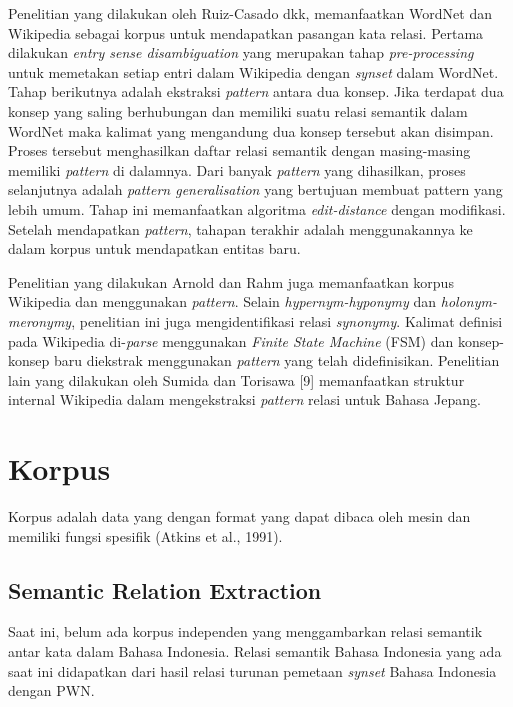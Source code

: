 Penelitian yang dilakukan oleh Ruiz-Casado dkk, memanfaatkan WordNet dan Wikipedia sebagai korpus untuk mendapatkan pasangan kata relasi. Pertama dilakukan \textit{entry sense disambiguation} yang merupakan tahap \textit{pre-processing} untuk memetakan setiap entri dalam Wikipedia dengan \textit{synset} dalam WordNet. Tahap berikutnya adalah ekstraksi \textit{pattern} antara dua konsep. Jika terdapat dua konsep yang saling berhubungan dan memiliki suatu relasi semantik dalam WordNet maka kalimat yang mengandung dua konsep tersebut akan disimpan. Proses tersebut menghasilkan daftar relasi semantik dengan masing-masing memiliki \textit{pattern} di dalamnya. Dari banyak \textit{pattern} yang dihasilkan, proses selanjutnya adalah \textit{pattern generalisation} yang bertujuan membuat pattern yang lebih umum. Tahap ini memanfaatkan algoritma \textit{edit-distance} dengan modifikasi. Setelah mendapatkan \textit{pattern}, tahapan terakhir adalah menggunakannya ke dalam korpus untuk mendapatkan entitas baru.

Penelitian yang dilakukan Arnold dan Rahm juga memanfaatkan korpus Wikipedia dan menggunakan \textit{pattern}. Selain \textit{hypernym-hyponymy} dan \textit{holonym-meronymy}, penelitian ini juga mengidentifikasi relasi \textit{synonymy}. Kalimat definisi pada Wikipedia di-\textit{parse} menggunakan \textit{Finite State Machine} (FSM) dan konsep-konsep baru diekstrak menggunakan \textit{pattern} yang telah didefinisikan. Penelitian lain yang dilakukan oleh Sumida dan Torisawa [9] memanfaatkan struktur internal Wikipedia dalam mengekstraksi \textit{pattern} relasi untuk Bahasa Jepang. 

\section{Korpus}
Korpus adalah data yang dengan format yang dapat dibaca oleh mesin dan memiliki fungsi spesifik (Atkins et al., 1991).

\subsection{Semantic Relation Extraction}
Saat ini, belum ada korpus independen yang menggambarkan relasi semantik antar kata dalam Bahasa Indonesia. Relasi semantik Bahasa Indonesia yang ada saat ini didapatkan dari hasil relasi turunan pemetaan \textit{synset} Bahasa Indonesia dengan PWN. 

